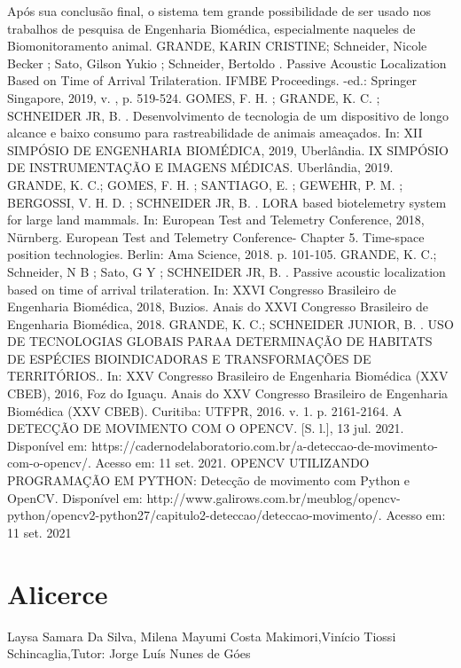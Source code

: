 Após sua conclusão final, o sistema tem grande possibilidade de ser usado nos trabalhos de
pesquisa de Engenharia Biomédica, especialmente naqueles de Biomonitoramento animal.
GRANDE, KARIN CRISTINE; Schneider, Nicole Becker ; Sato, Gilson Yukio ; Schneider, Bertoldo . Passive Acoustic Localization
Based on Time of Arrival Trilateration. IFMBE Proceedings. -ed.: Springer Singapore, 2019, v. , p. 519-524.
GOMES, F. H. ; GRANDE, K. C. ; SCHNEIDER JR, B. . Desenvolvimento de tecnologia de um dispositivo de longo alcance e baixo
consumo para rastreabilidade de animais ameaçados. In: XII SIMPÓSIO DE ENGENHARIA BIOMÉDICA, 2019, Uberlândia. IX
SIMPÓSIO DE INSTRUMENTAÇÃO E IMAGENS MÉDICAS. Uberlândia, 2019.
GRANDE, K. C.; GOMES, F. H. ; SANTIAGO, E. ; GEWEHR, P. M. ; BERGOSSI, V. H. D. ; SCHNEIDER JR, B. . LORA based
biotelemetry system for large land mammals. In: European Test and Telemetry Conference, 2018, Nürnberg. European Test and
Telemetry Conference- Chapter 5. Time-space position technologies. Berlin: Ama Science, 2018. p. 101-105.
GRANDE, K. C.; Schneider, N B ; Sato, G Y ; SCHNEIDER JR, B. . Passive acoustic localization based on time of arrival trilateration.
In: XXVI Congresso Brasileiro de Engenharia Biomédica, 2018, Buzios. Anais do XXVI Congresso Brasileiro de Engenharia
Biomédica, 2018.
GRANDE, K. C.; SCHNEIDER JUNIOR, B. . USO DE TECNOLOGIAS GLOBAIS PARAA DETERMINAÇÃO DE HABITATS DE
ESPÉCIES BIOINDICADORAS E TRANSFORMAÇÕES DE TERRITÓRIOS.. In: XXV Congresso Brasileiro de Engenharia
Biomédica (XXV CBEB), 2016, Foz do Iguaçu. Anais do XXV Congresso Brasileiro de Engenharia Biomédica (XXV CBEB). Curitiba:
UTFPR, 2016. v. 1. p. 2161-2164.
A DETECÇÃO DE MOVIMENTO COM O OPENCV. [S. l.], 13 jul. 2021. Disponível em:
https://cadernodelaboratorio.com.br/a-deteccao-de-movimento-com-o-opencv/. Acesso em: 11 set. 2021.
OPENCV UTILIZANDO PROGRAMAÇÃO EM PYTHON: Detecção de movimento com Python e OpenCV. Disponível em:
http://www.galirows.com.br/meublog/opencv-python/opencv2-python27/capitulo2-deteccao/deteccao-movimento/. Acesso em: 11 set.
2021



\section{Alicerce}

Laysa Samara Da Silva, Milena Mayumi Costa Makimori,Vinício Tiossi  Schincaglia,Tutor: Jorge Luís Nunes de Góes

